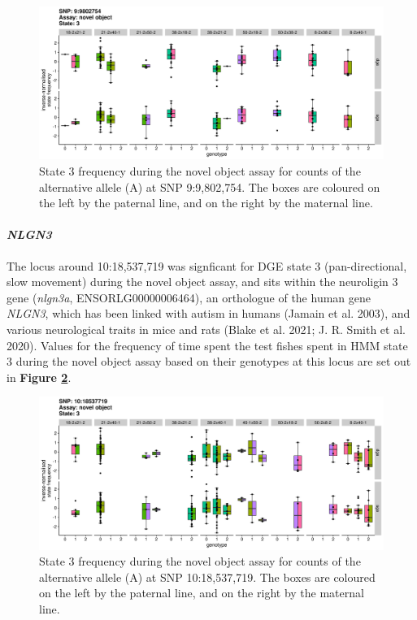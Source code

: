 \documentclass[
]{book}
\begin{document}
\begin{figure}
\includegraphics[width=1\linewidth]{figs/mikk_behaviour/sig_snps_boxplots/3-9:9802754} \caption{State 3 frequency during the novel object assay for counts of the alternative allele (A) at SNP 9:9,802,754. The boxes are coloured on the left by the paternal line, and on the right by the maternal line.}\label{fig:sig-snp-9-9mb}
\end{figure}

\hypertarget{nlgn3}{%
\paragraph{\texorpdfstring{\emph{NLGN3}}{NLGN3}}\label{nlgn3}}

The locus around 10:18,537,719 was signficant for DGE state 3 (pan-directional, slow movement) during the novel object assay, and sits within the neuroligin 3 gene (\emph{nlgn3a}, ENSORLG00000006464), an orthologue of the human gene \emph{NLGN3}, which has been linked with autism in humans (Jamain et al. 2003), and various neurological traits in mice and rats (Blake et al. 2021; J. R. Smith et al. 2020). Values for the frequency of time spent the test fishes spent in HMM state 3 during the novel object assay based on their genotypes at this locus are set out in \textbf{Figure \ref{fig:sig-snp-10-18mb}}.



\begin{figure}
\includegraphics[width=1\linewidth]{figs/mikk_behaviour/sig_snps_boxplots/3-10:18537719} \caption{State 3 frequency during the novel object assay for counts of the alternative allele (A) at SNP 10:18,537,719. The boxes are coloured on the left by the paternal line, and on the right by the maternal line.}\label{fig:sig-snp-10-18mb}
\end{figure}
\end{document}

